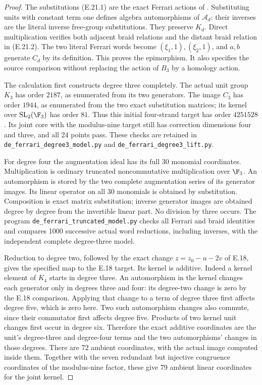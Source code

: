 \begin{proof}
The substitutions (E.21.1) are the exact
Ferrari actions of
\cite[(2.9) and (4.15)]{DE_NakamuraTsunogaiYasuda2010}.
Substituting units with constant term one
defines algebra automorphisms of
$\mathcal A_d$: their inverses are the
literal inverse free-group substitutions.
They preserve $K_d$. Direct multiplication
verifies both adjacent braid relations and
the distant braid relation in (E.21.2).
The two literal Ferrari words become
$(\xi_1,1),(\xi_2,1)$, and $a,b$ generate
$C_d$ by its definition. This proves the
epimorphism. It also specifies the source
comparison without replacing the action
of $B_3$ by a homology action.

The calculation first constructs degree
three completely. The actual unit group
$K_3$ has order $2187$, as enumerated
from its two generators. The image
$C_3$ has order $1944$, as enumerated
from the two exact substitution matrices;
its kernel over $\mathrm{SL}_2(\F_3)$
has order $81$. Thus this initial
four-strand target has order $4251528$.
Its joint core with the modulus-nine
target still has correction dimensions
four and three, and all 24 points pass.
These checks are retained in
\texttt{de\_ferrari\_degree3\_model.py}
and \texttt{de\_ferrari\_degree3\_lift.py}.

For degree four the augmentation ideal
has its full 30 monomial coordinates.
Multiplication is ordinary truncated
noncommutative multiplication over
$\F_3$. An automorphism is stored by
the two complete augmentation series
of its generator images. Its linear
operator on all 30 monomials is obtained
by substitution. Composition is exact
matrix substitution; inverse generator
images are obtained degree by degree
from the invertible linear part.
No division by three occurs. The
program \texttt{de\_ferrari\_truncated\_model.py}
checks all Ferrari and braid identities
and compares 1000 successive actual
word reductions, including inverses,
with the independent complete
degree-three model.

Reduction to degree two, followed by
the exact change $z=z_0-u-2v$ of E.18,
gives the specified map to the E.18
target. Its kernel is additive. Indeed
a kernel element of $K_4$ starts in
degree three. An automorphism in the
kernel changes each generator only
in degrees three and four: its
degree-two change is zero by the
E.18 comparison. Applying that change
to a term of degree three first affects
degree five, which is zero here.
Two such automorphism changes also
commute, since their commutator first
affects degree five. Products of two
kernel unit changes first occur in
degree six. Therefore the exact
additive coordinates are the unit's
degree-three and degree-four terms
and the two automorphisms' changes
in those degrees. There are 72
ambient coordinates, with the
actual image computed inside them.
Together with the seven redundant
but injective congruence coordinates
of the modulus-nine factor, these
give 79 ambient linear coordinates
for the joint kernel.


\end{proof}
